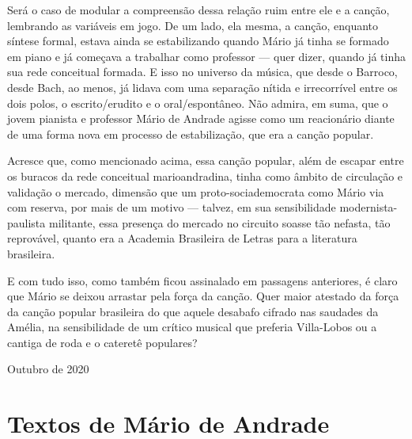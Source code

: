 Será o caso de modular a compreensão dessa relação ruim entre ele e a
canção, lembrando as variáveis em jogo. De um lado, ela mesma, a canção,
enquanto síntese formal, estava ainda se estabilizando quando Mário já
tinha se formado em piano e já começava a trabalhar como professor ---
quer dizer, quando já tinha sua rede conceitual formada. E isso no
universo da música, que desde o Barroco, desde Bach, ao menos, já lidava
com uma separação nítida e irrecorrível entre os dois polos, o
escrito/erudito e o oral/espontâneo. Não admira, em suma, que o jovem
pianista e professor Mário de Andrade agisse como um reacionário diante
de uma forma nova em processo de estabilização, que era a canção
popular.

Acresce que, como mencionado acima, essa canção popular, além de escapar
entre os buracos da rede conceitual marioandradina, tinha como âmbito de
circulação e validação o mercado, dimensão que um proto-sociademocrata
como Mário via com reserva, por mais de um motivo --- talvez, em sua
sensibilidade modernista-paulista militante, essa presença do mercado no
circuito soasse tão nefasta, tão reprovável, quanto era a Academia
Brasileira de Letras para a literatura brasileira.

E com tudo isso, como também ficou assinalado em passagens anteriores, é
claro que Mário se deixou arrastar pela força da canção. Quer maior
atestado da força da canção popular brasileira do que aquele desabafo
cifrado nas saudades da Amélia, na sensibilidade de um crítico musical
que preferia Villa-Lobos ou a cantiga de roda e o cateretê populares?

\begin{flushright}
Outubro de 2020
\end{flushright}

\part{Textos de Mário de Andrade}



